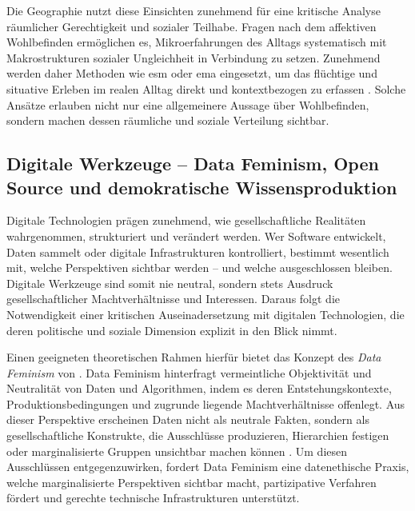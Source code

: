 Die Geographie nutzt diese Einsichten zunehmend für eine kritische Analyse räumlicher Gerechtigkeit und sozialer Teilhabe. Fragen nach dem affektiven Wohlbefinden ermöglichen es, Mikroerfahrungen des Alltags systematisch mit Makrostrukturen sozialer Ungleichheit in Verbindung zu setzen. Zunehmend werden daher Methoden wie \acrfull{esm} oder \acrfull{ema} eingesetzt, um das flüchtige und situative Erleben im realen Alltag direkt und kontextbezogen zu erfassen \parencite{songRecallBiasIntegrating2025}. Solche Ansätze erlauben nicht nur eine allgemeinere Aussage über Wohlbefinden, sondern machen dessen räumliche und soziale Verteilung sichtbar.

\subsection{Digitale Werkzeuge -- Data Feminism, Open Source und demokratische Wissensproduktion}

Digitale Technologien prägen zunehmend, wie gesellschaftliche Realitäten wahrgenommen, strukturiert und verändert werden. Wer Software entwickelt, Daten sammelt oder digitale Infrastrukturen kontrolliert, bestimmt wesentlich mit, welche Perspektiven sichtbar werden -- und welche ausgeschlossen bleiben. Digitale Werkzeuge sind somit nie neutral, sondern stets Ausdruck gesellschaftlicher Machtverhältnisse und Interessen. Daraus folgt die Notwendigkeit einer kritischen Auseinadersetzung mit digitalen Technologien, die deren politische und soziale Dimension explizit in den Blick nimmt.

Einen geeigneten theoretischen Rahmen hierfür bietet das Konzept des \textit{Data Feminism} von \textcite{dignazioDataFeminism2020}. Data Feminism hinterfragt vermeintliche Objektivität und Neutralität von Daten und Algorithmen, indem es deren Entstehungskontexte, Produktionsbedingungen und zugrunde liegende Machtverhältnisse offenlegt. Aus dieser Perspektive erscheinen Daten nicht als neutrale Fakten, sondern als gesellschaftliche Konstrukte, die Ausschlüsse produzieren, Hierarchien festigen oder marginalisierte Gruppen unsichtbar machen können \parencite{dignazioDataFeminism2020, elwoodFeministDigitalGeographies2018}. Um diesen Ausschlüssen entgegenzuwirken, fordert Data Feminism eine datenethische Praxis, welche marginalisierte Perspektiven sichtbar macht, partizipative Verfahren fördert und gerechte technische Infrastrukturen unterstützt.

